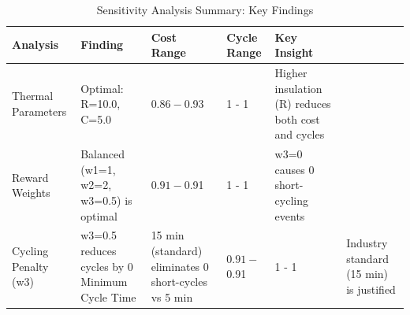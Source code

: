 
\begin{table}[htbp]
\centering
\caption{Sensitivity Analysis Summary: Key Findings}
\label{tab:sensitivity}
\small
\begin{tabular}{p{2.5cm}p{4cm}p{2cm}p{2cm}p{4cm}}
\toprule
\textbf{Analysis} & \textbf{Finding} & \textbf{Cost Range} & \textbf{Cycle Range} & \textbf{Key Insight} \\
\midrule
Thermal Parameters & Optimal: R=10.0, C=5.0 & $0.86 - $0.93 & 1 - 1 & Higher insulation (R) reduces both cost and cycles \\
Reward Weights & Balanced (w1=1, w2=2, w3=0.5) is optimal & $0.91 - $0.91 & 1 - 1 & w3=0 causes 0 short-cycling events \\
Cycling Penalty (w3) & w3=0.5 reduces cycles by 0%
Minimum Cycle Time & 15 min (standard) eliminates 0 short-cycles vs 5 min & $0.91 - $0.91 & 1 - 1 & Industry standard (15 min) is justified \\

\bottomrule
\end{tabular}
\end{table}
